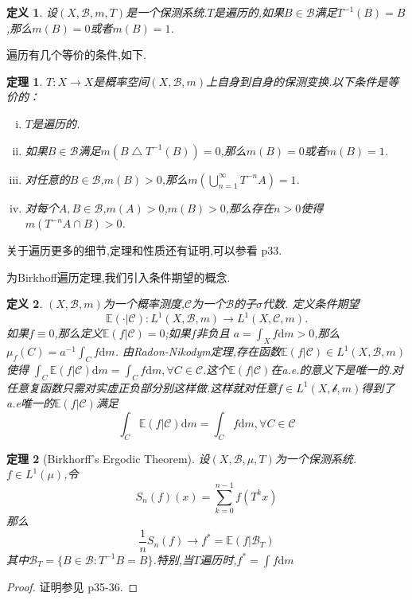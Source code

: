 \documentclass[a4paper,11pt,oneside]{book}
\newtheorem{theorem}{\textbf{\hspace{0.7cm}定理}}[section]
\newtheorem{definition}{\textbf{\hspace{0.7cm}定义}}[section]
\newcommand{\ms}[1]{\mathscr{#1}}
\begin{document}
\begin{definition}
设$(X,\ms{B},m,T)$是一个保测系统.$T$是遍历的,如果$B\in\ms B $满足$T^{-1}(B)=B$,那么$m(B)=0$或者$m(B)=1$.
\end{definition}

遍历有几个等价的条件,如下.
\begin{theorem}
$T:X \rightarrow X$是概率空间$(X,\ms{B},m)$上自身到自身的保测变换.以下条件是等价的：
\begin{enumerate}[(i)]
\item $T$是遍历的.
\item 如果$B\in\ms B$满足$m(B\bigtriangleup T^{-1}(B))=0$,那么$m(B)=0$或者$m(B)=1$.
\item 对任意的$B\in\ms B$,$m(B)>0$,那么$m(\bigcup_{n=1}^{\infty}T^{-n}A)=1$.
\item 对每个$A,B\in\ms B$,$m(A)>0$,$m(B)>0$,那么存在$n>0$使得$m(T^{-n}A\cap B)>0$.
\end{enumerate}
\end{theorem}

关于遍历更多的细节,定理和性质还有证明,可以参看\cite{pw} p33.

为Birkhoff遍历定理,我们引入条件期望的概念.
\begin{definition}
$(X,\ms{B},m)$为一个概率测度,$\ms C$为一个$\ms B$的子$\sigma$代数.
定义条件期望$$\mathbb{E}(\cdot|\ms{C}):L^1(X,\ms{B},m)\rightarrow L^1(X,\ms{C},m).$$如果$f\equiv 0$,那么定义$\mathbb{E}(f|\ms{C})=0$;如果$f$非负且%
$a=\int_X f \mathrm d m>0$,那么$\mu_f(C)=a^{-1}\int_C f\mathrm d m$.
由Radon-Nikodym定理,存在函数$\mathbb{E}(f|\ms{C})\in L^1(X,\ms B,m)$使得%
$\int_C \mathbb{E}(f|\ms{C})\mathrm d m=\int_C f\mathrm d m,\forall C\in \ms C$.这个$\mathbb{E}(f|\ms{C})$在a.e.的意义下是唯一的.对任意复函数只需对实虚正负部分别这样做.这样就对任意$f\in L^1(X,\ms b,m)$得到了a.e唯一的$\mathbb{E}(f|\ms{C})$满足$$\int_C \mathbb{E}(f|\ms{C})\mathrm d m=\int_C f\mathrm d m,\forall C\in \ms C$$
\end{definition}

\begin{theorem}[Birkhorff's Ergodic Theorem]
设$(X,\ms B,\mu,T)$为一个保测系统.$f\in L^1(\mu)$,令$$S_n(f)(x)=\sum_{k=0}^{n-1}f(T^kx)$$那么$$\frac{1}{n}S_n(f)\rightarrow f^*=\mathbb{E}(f|\ms B_T)$$
其中$\ms B_T=\{B\in \ms B:T^{-1}B=B\}$.特别,当$T$遍历时,$f^*=\int f \mathrm d m$
\end{theorem}
\begin{proof}
证明参见\cite{hy} p35-36.
\end{proof}
\end{document}
